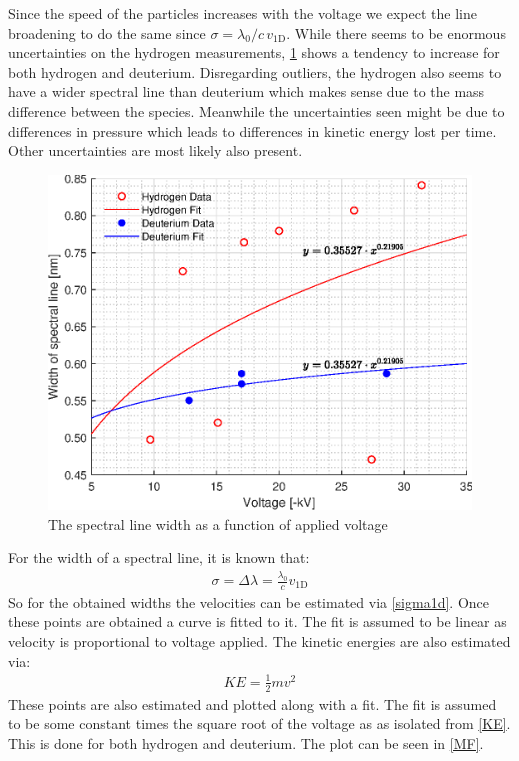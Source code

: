 Since the speed of the particles increases with the voltage we expect the line broadening to do the same since $\sigma=\lambda_{0}/c\, v_{\mathrm{1D}}$. While there seems to be enormous uncertainties on the hydrogen measurements, \cref{Vsigma} shows a tendency to increase for both hydrogen and deuterium. Disregarding outliers, the hydrogen also seems to have a wider spectral line than deuterium which makes sense due to the mass difference between the species. Meanwhile the uncertainties seen might be due to differences in pressure which leads to differences in kinetic energy lost per time. Other uncertainties are most likely also present.
\begin{figure}
    \centering
    \includegraphics[width=.7\textwidth]{MatlabFigures/Asign3/VSigma.eps}
    \caption{The spectral line width as a function of applied voltage}
    \label{Vsigma}
\end{figure}
For the width of a spectral line, it is known that:
\begin{align}
    \sigma = \Delta\lambda = \frac{\lambda_0}{c} v_{\mathrm{1D}}\label{sigma1d}
\end{align}
So for the obtained widths the velocities can be estimated via \cref{sigma1d}. Once these points are obtained a curve is fitted to it. The fit is assumed to be linear as velocity is proportional to voltage applied. The kinetic energies are also estimated via:
\begin{align}
    KE = \frac{1}{2}mv^2\label{KE}
\end{align}
These points are also estimated and plotted along with a fit. The fit is assumed to be some constant times the square root of the voltage as as isolated from \cref{KE}. This is done for both hydrogen and deuterium. The plot can be seen in \cref{MF}.
